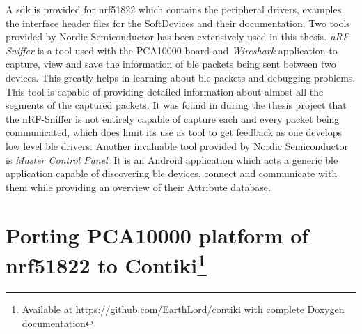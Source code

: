 A \gls{sdk} is provided for nrf51822 which contains the peripheral drivers, examples, the interface header files for the SoftDevices and their documentation. Two tools provided by Nordic Semiconductor has been extensively used in this thesis. \emph{nRF Sniffer} is a tool used with the PCA10000 board and \emph{Wireshark} application to capture, view and save the information of \gls{ble} packets being sent between two devices. This greatly helps in learning about \gls{ble} packets and debugging problems. This tool is capable of providing detailed information about almost all the segments of the captured packets. It was found in during the thesis project that the nRF-Sniffer is not entirely capable of capture each and every packet being communicated, which does limit its use as tool to get feedback as one develops low level \gls{ble} drivers. Another invaluable tool provided by Nordic Semiconductor is \emph{Master Control Panel}. It is an Android application which acts a generic \gls{ble} application capable of discovering \gls{ble} devices, connect and communicate with them while providing an overview of their Attribute database. 

%

\section[Porting PCA10000 platform of nrf51822 to Contiki]{Porting PCA10000 platform of nrf51822 to Contiki\footnote{Available at \url{https://github.com/EarthLord/contiki} with complete Doxygen documentation}} \label{5Porting}

